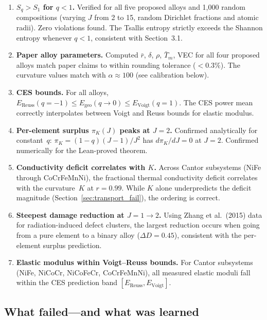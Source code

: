 \documentclass[12pt,letterpaper]{article}
\theoremstyle{definition}
\begin{document}
\begin{enumerate}
  \item \textbf{$S_q > S_1$ for $q < 1$.}  Verified for all five proposed alloys and 1{,}000 random compositions (varying $J$ from 2 to 15, random Dirichlet fractions and atomic radii).  Zero violations found.  The Tsallis entropy strictly exceeds the Shannon entropy whenever $q < 1$, consistent with Section~3.1.

  \item \textbf{Paper alloy parameters.}  Computed $\bar{r}$, $\delta$, $\rho$, $\bar{T}_m$, VEC for all four proposed alloys match paper claims to within rounding tolerance ($<0.3\%$).  The curvature values match with $\alpha \approx 100$ (see calibration below).

  \item \textbf{CES bounds.}  For all alloys, $E_{\mathrm{Reuss}}(q=-1) \leq E_{\mathrm{geo}}(q \to 0) \leq E_{\mathrm{Voigt}}(q=1)$.  The CES power mean correctly interpolates between Voigt and Reuss bounds for elastic modulus.

  \item \textbf{Per-element surplus $\pi_K(J)$ peaks at $J = 2$.}  Confirmed analytically for constant~$q$: $\pi_K = (1-q)(J-1)/J^2$ has $d\pi_K/dJ = 0$ at $J = 2$.  Confirmed numerically for the Lean-proved theorem.

  \item \textbf{Conductivity deficit correlates with $K$.}  Across Cantor subsystems (NiFe through CoCrFeMnNi), the fractional thermal conductivity deficit correlates with the curvature~$K$ at $r = 0.99$.  While $K$ alone underpredicts the deficit magnitude (Section~\ref{sec:transport_fail}), the ordering is correct.

  \item \textbf{Steepest damage reduction at $J = 1 \to 2$.}  Using Zhang et al.\ (2015) data for radiation-induced defect clusters, the largest reduction occurs when going from a pure element to a binary alloy ($\Delta D = 0.45$), consistent with the per-element surplus prediction.

  \item \textbf{Elastic modulus within Voigt--Reuss bounds.}  For Cantor subsystems (NiFe, NiCoCr, NiCoFeCr, CoCrFeMnNi), all measured elastic moduli fall within the CES prediction band $[E_{\mathrm{Reuss}}, E_{\mathrm{Voigt}}]$.
\end{enumerate}

\subsection{What failed---and what was learned}
\end{document}
